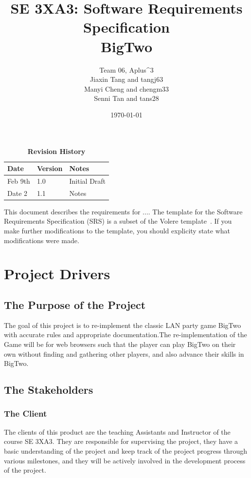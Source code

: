 \documentclass[12pt, titlepage]{article}
\title{SE 3XA3: Software Requirements Specification\\BigTwo}
\author{Team 06, Aplus^3
		\\ Jiaxin Tang and tangj63
		\\ Manyi Cheng and chengm33
		\\ Senni Tan and tans28
}
\date{\today}
\begin{document}
\maketitle

\tableofcontents
\listoftables
\listoffigures

\begin{table}[bp]
\caption{\bf Revision History}
\begin{tabularx}{\textwidth}{p{3cm}p{2cm}X}
\toprule {\bf Date} & {\bf Version} & {\bf Notes}\\
\midrule
Feb 9th & 1.0 & Initial Draft\\
Date 2 & 1.1 & Notes\\
\bottomrule
\end{tabularx}
\end{table}

\newpage


This document describes the requirements for ....  The template for the Software
Requirements Specification (SRS) is a subset of the Volere
template~\citep{RobertsonAndRobertson2012}.  If you make further modifications
to the template, you should explicity state what modifications were made.

\section{Project Drivers}

\subsection{The Purpose of the Project}
The goal of this project is to re-implement the classic LAN party game BigTwo with accurate rules and appropriate documentation.The re-implementation of the Game will be for web browsers such that the player can play BigTwo on their own without finding and gathering other players, and also advance their skills in BigTwo.

\subsection{The Stakeholders}

\subsubsection{The Client}
The clients of this product are the teaching Assistants and Instructor of the course SE 3XA3. They are responsible for supervising the project, they have a basic understanding of the project and keep track of the project progress through various milestones, and they will be actively involved in the development process of the project.
\end{document}
